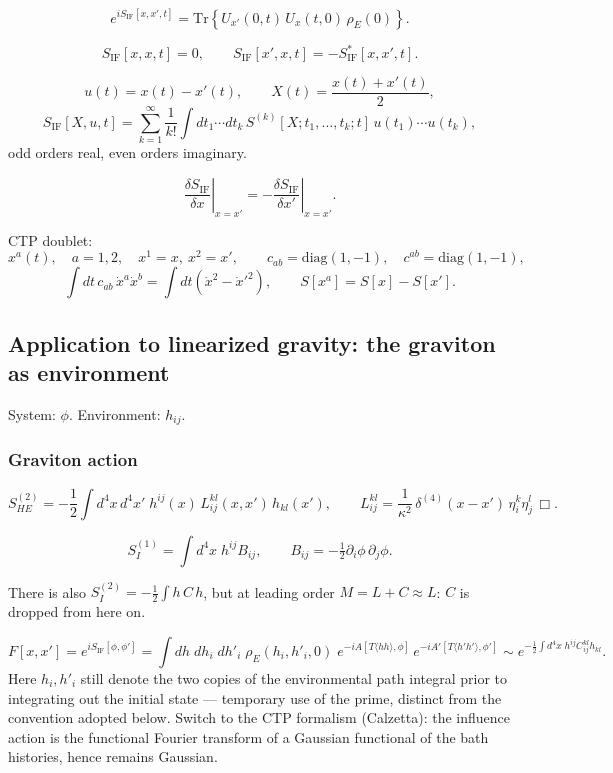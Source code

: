 \documentclass[12pt,a4paper,oneside]{article}
\numberwithin{equation}{section}   %
\begin{document}
\[
e^{i S_{\mathrm{IF}}[x,x',t]} = \mathrm{Tr}\left\{U_{x'}(0,t)\,U_x(t,0)\,\rho_E(0)\right\}.
\]

\[
S_{\mathrm{IF}}[x,x,t]=0,
\qquad
S_{\mathrm{IF}}[x',x,t] = - S_{\mathrm{IF}}^*[x,x',t].
\]

\[
u(t)=x(t)-x'(t), \qquad X(t)=\frac{x(t)+x'(t)}{2},
\]
\[
S_{\mathrm{IF}}[X,u,t]
=
\sum_{k=1}^{\infty}
\frac{1}{k!}
\int dt_1 \cdots dt_k\,
S^{(k)}[X;t_1,\dots,t_k;t]\,
u(t_1)\cdots u(t_k),
\]
odd orders real, even orders imaginary.

\[
\left.\frac{\delta S_{\mathrm{IF}}}{\delta x}\right|_{x=x'}
=
-
\left.\frac{\delta S_{\mathrm{IF}}}{\delta x'}\right|_{x=x'}.
\]

CTP doublet:
\[
x^a(t), \quad a=1,2, \quad x^1=x,\ x^2=x',
\qquad
c_{ab}=\mathrm{diag}(1,-1), \quad c^{ab}=\mathrm{diag}(1,-1),
\]
\[
\int dt\, c_{ab}\,\dot{x}^a \dot{x}^b
=
\int dt\left(\dot{x}^2-\dot{x}'^2\right),
\qquad
S[x^a] = S[x]-S[x'].
\]

\subsection{Application to linearized gravity: the graviton as environment}

System: $\phi$. Environment: $h_{ij}$.

\subsubsection{Graviton action}

\[
S_{HE}^{(2)} = -\frac12\int d^4x\,d^4x'\; h^{ij}(x)\,L_{ij}^{kl}(x,x')\,h_{kl}(x'),
\qquad
L_{ij}^{kl} = \frac{1}{\kappa^2}\,\delta^{(4)}(x-x')\,\eta_i^k\eta_j^l\,\Box.
\]

\[
S_I^{(1)} = \int d^4x\; h^{ij}B_{ij}, \qquad B_{ij} = -\tfrac12\partial_i\phi\,\partial_j\phi.
\]

There is also $S_I^{(2)}=-\frac12\int h\,C\,h$, but at leading order $M=L+C\approx L$: $C$ is dropped from here on.

\[
F[x,x']
=
e^{iS_{\mathrm{IF}}[\phi,\phi']}
=
\int dh\;dh_i\;dh'_i\;
\rho_E(h_i,h'_i,0)\;
e^{-iA[T\langle hh\rangle,\phi]}\,
e^{-iA'[T\langle h'h'\rangle,\phi']}
\sim e^{-\frac12\int d^4x\; h^{ij}C_{ij}^{kl} h_{kl}}.
\]
Here $h_i,h'_i$ still denote the two copies of the environmental path integral prior to integrating out the initial state — temporary use of the prime, distinct from the convention adopted below. Switch to the CTP formalism (Calzetta): the influence action is the functional Fourier transform of a Gaussian functional of the bath histories, hence remains Gaussian.
\end{document}
